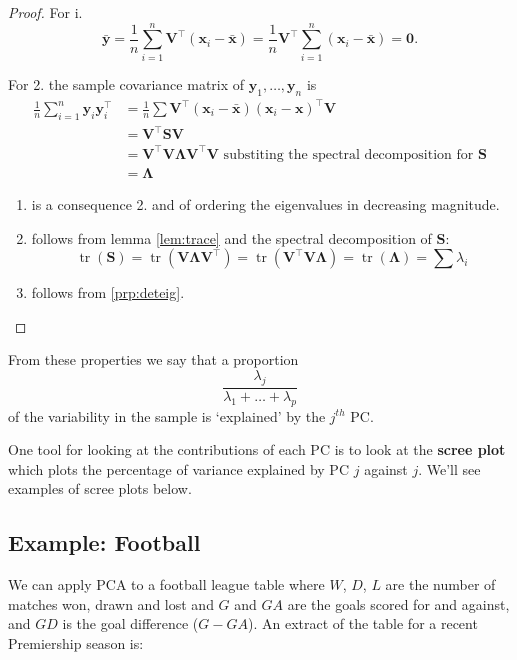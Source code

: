 \documentclass[]{book}
\theoremstyle{definition}
\theoremstyle{definition}
\theoremstyle{definition}
\theoremstyle{remark}
\begin{document}
\begin{proof}
{}For i.
\[\bar{\mathbf y} = \frac{1}{n}\sum_{i=1}^n \mathbf V^\top(\mathbf x_i-\bar{\mathbf x}) = \frac{1}{n} \mathbf V^\top\sum_{i=1}^n(\mathbf x_i-\bar{\mathbf x}) =\boldsymbol 0.\]

For 2. the sample covariance matrix of \(\mathbf y_1, \ldots, \mathbf y_n\) is
\begin{align*}
\frac{1}{n}\sum_{i=1}^n \mathbf y_i \mathbf y_i^\top &=\frac{1}{n} \sum \mathbf V^\top (\mathbf x_i-\bar{\mathbf x})(\mathbf x_i - \mathbf x)^\top \mathbf V\\
&=\mathbf V^\top \mathbf S\mathbf V\\
&=\mathbf V^\top \mathbf V\boldsymbol \Lambda\mathbf V^\top \mathbf V\mbox{ substiting the spectral decomposition for }\mathbf S\\
&=\boldsymbol \Lambda
\end{align*}

\begin{enumerate}
\def\labelenumi{\arabic{enumi}.}
\setcounter{enumi}{2}
\item
  is a consequence 2. and of ordering the eigenvalues in decreasing magnitude.
\item
  follows from lemma \ref{lem:trace} and the spectral decomposition of \(\mathbf S\):
  \[\operatorname{tr}(\mathbf S) = \operatorname{tr}(\mathbf V\boldsymbol \Lambda\mathbf V^\top)  =\operatorname{tr}(\mathbf V^\top \mathbf V\boldsymbol \Lambda)=\operatorname{tr}(\boldsymbol \Lambda)=\sum\lambda_i\]
\item
  follows from \ref{prp:deteig}.
\end{enumerate}
\end{proof}

From these properties we say that a proportion
\[\frac{\lambda_j}{\lambda_1 + \ldots + \lambda_p}\]
of the variability in the sample is `explained' by the \(j^{th}\) PC.

One tool for looking at the contributions of each PC is to look at the \textbf{scree plot} which plots the percentage of variance explained by PC \(j\) against \(j\). We'll see examples of scree plots below.

\hypertarget{example-football}{%
\subsection{Example: Football}\label{example-football}}

We can apply PCA to a football league table where \(W\), \(D\), \(L\) are the number of matches won, drawn and lost and \(G\) and \(GA\) are the goals scored for and against, and \(GD\) is the goal difference (\(G-GA\)). An extract of the table for a recent Premiership season is:
\end{document}
